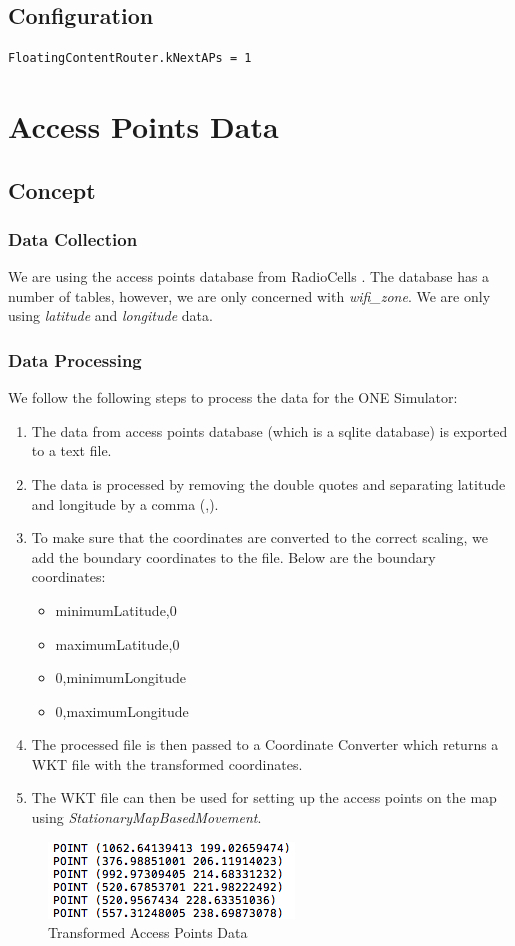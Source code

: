\subsection{Configuration}
\begin{lstlisting}[language=bash]
FloatingContentRouter.kNextAPs = 1
\end{lstlisting}
\newpage
\section{Access Points Data}
\subsection{Concept}
\subsubsection{Data Collection}
We are using the access points database from RadioCells \cite{wifi-data}. The database has a number of tables, however, we are only concerned with \textit{wifi\_zone}. We are only using \textit{latitude} and \textit{longitude} data.
\subsubsection{Data Processing}
We follow the following steps to process the data for the ONE Simulator:
\begin{enumerate}
	\item The data from access points database (which is a sqlite database) \cite{wifi-data} is exported to a text file.
	\item The data is processed by removing the double quotes and separating latitude and longitude by a comma (,).
	\item To make sure that the coordinates are converted to the correct scaling, we add the boundary coordinates to the file. Below are the boundary coordinates:
	\begin{itemize}
		\item minimumLatitude,0
		\item maximumLatitude,0
		\item 0,minimumLongitude
		\item 0,maximumLongitude
	\end{itemize}
	\item The processed file is then passed to a Coordinate Converter which returns a WKT file with the transformed coordinates.
	\item The WKT file can then be used for setting up the access points on the map using \textit{StationaryMapBasedMovement}.
\end{enumerate}
\begin{figure}[h]
	\centering
	\includegraphics{./figures/access-points-data}
	\caption{Transformed Access Points Data}
\end{figure}

